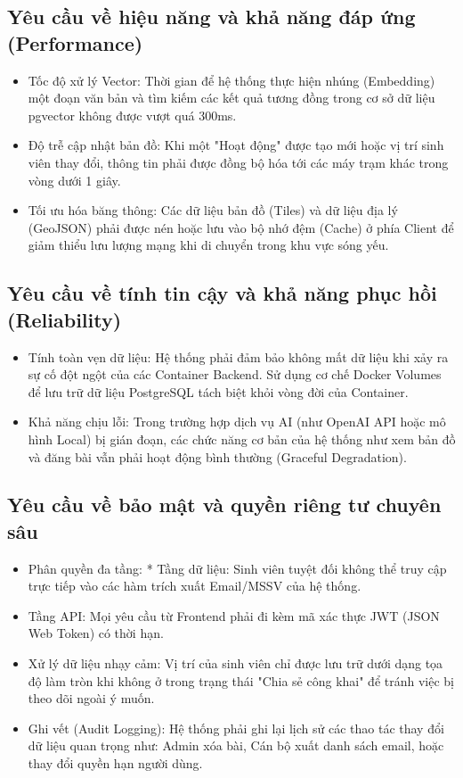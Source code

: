 \subsection{Yêu cầu về hiệu năng và khả năng đáp ứng (Performance)} 
\begin{itemize}
    \item Tốc độ xử lý Vector: Thời gian để hệ thống thực hiện nhúng (Embedding) một đoạn văn bản và tìm kiếm các kết quả tương đồng trong cơ sở dữ liệu pgvector không được vượt quá 300ms.

    \item Độ trễ cập nhật bản đồ: Khi một "Hoạt động" được tạo mới hoặc vị trí sinh viên thay đổi, thông tin phải được đồng bộ hóa tới các máy trạm khác trong vòng dưới 1 giây.

    \item Tối ưu hóa băng thông: Các dữ liệu bản đồ (Tiles) và dữ liệu địa lý (GeoJSON) phải được nén hoặc lưu vào bộ nhớ đệm (Cache) ở phía Client để giảm thiểu lưu lượng mạng khi di chuyển trong khu vực sóng yếu.
\end{itemize}


\subsection{Yêu cầu về tính tin cậy và khả năng phục hồi (Reliability)} 
\begin{itemize}
    \item Tính toàn vẹn dữ liệu: Hệ thống phải đảm bảo không mất dữ liệu khi xảy ra sự cố đột ngột của các Container Backend. Sử dụng cơ chế Docker Volumes để lưu trữ dữ liệu PostgreSQL tách biệt khỏi vòng đời của Container.

    \item Khả năng chịu lỗi: Trong trường hợp dịch vụ AI (như OpenAI API hoặc mô hình Local) bị gián đoạn, các chức năng cơ bản của hệ thống như xem bản đồ và đăng bài vẫn phải hoạt động bình thường (Graceful Degradation).
\end{itemize}


\subsection{Yêu cầu về bảo mật và quyền riêng tư chuyên sâu} 
\begin{itemize}
    \item Phân quyền đa tầng: * Tầng dữ liệu: Sinh viên tuyệt đối không thể truy cập trực tiếp vào các hàm trích xuất Email/MSSV của hệ thống.

    \item Tầng API: Mọi yêu cầu từ Frontend phải đi kèm mã xác thực JWT (JSON Web Token) có thời hạn.

    \item Xử lý dữ liệu nhạy cảm: Vị trí của sinh viên chỉ được lưu trữ dưới dạng tọa độ làm tròn khi không ở trong trạng thái "Chia sẻ công khai" để tránh việc bị theo dõi ngoài ý muốn.

    \item Ghi vết (Audit Logging): Hệ thống phải ghi lại lịch sử các thao tác thay đổi dữ liệu quan trọng như: Admin xóa bài, Cán bộ xuất danh sách email, hoặc thay đổi quyền hạn người dùng.
\end{itemize}


